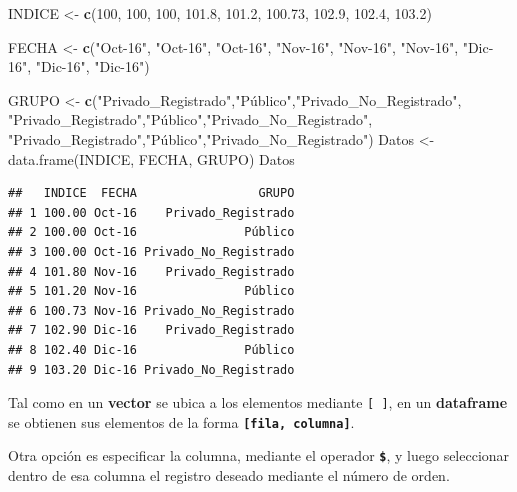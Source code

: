 \documentclass[]{book}
\newenvironment{Shaded}{\begin{snugshade}}{\end{snugshade}}
\newcommand{\DecValTok}[1]{\textcolor[rgb]{0.00,0.00,0.81}{#1}}
\newcommand{\FloatTok}[1]{\textcolor[rgb]{0.00,0.00,0.81}{#1}}
\newcommand{\KeywordTok}[1]{\textcolor[rgb]{0.13,0.29,0.53}{\textbf{#1}}}
\newcommand{\NormalTok}[1]{#1}
\newcommand{\StringTok}[1]{\textcolor[rgb]{0.31,0.60,0.02}{#1}}
\begin{document}
\begin{Shaded}
\begin{Highlighting}[]
\NormalTok{INDICE  <-}\StringTok{ }\KeywordTok{c}\NormalTok{(}\DecValTok{100}\NormalTok{,   }\DecValTok{100}\NormalTok{,   }\DecValTok{100}\NormalTok{,}
             \FloatTok{101.8}\NormalTok{, }\FloatTok{101.2}\NormalTok{, }\FloatTok{100.73}\NormalTok{,}
             \FloatTok{102.9}\NormalTok{, }\FloatTok{102.4}\NormalTok{, }\FloatTok{103.2}\NormalTok{)}

\NormalTok{FECHA  <-}\StringTok{  }\KeywordTok{c}\NormalTok{(}\StringTok{"Oct-16"}\NormalTok{, }\StringTok{"Oct-16"}\NormalTok{, }\StringTok{"Oct-16"}\NormalTok{,}
             \StringTok{"Nov-16"}\NormalTok{, }\StringTok{"Nov-16"}\NormalTok{, }\StringTok{"Nov-16"}\NormalTok{,}
             \StringTok{"Dic-16"}\NormalTok{, }\StringTok{"Dic-16"}\NormalTok{, }\StringTok{"Dic-16"}\NormalTok{)}

\NormalTok{GRUPO  <-}\StringTok{  }\KeywordTok{c}\NormalTok{(}\StringTok{"Privado_Registrado"}\NormalTok{,}\StringTok{"Público","}\NormalTok{Privado_No_Registrado}\StringTok{",}
\StringTok{             "}\NormalTok{Privado_Registrado}\StringTok{","}\NormalTok{Público",}\StringTok{"Privado_No_Registrado"}\NormalTok{,}
             \StringTok{"Privado_Registrado"}\NormalTok{,}\StringTok{"Público","}\NormalTok{Privado_No_Registrado}\StringTok{")}
\StringTok{             }
\StringTok{Datos <- data.frame(INDICE, FECHA, GRUPO)}
\StringTok{Datos}
\end{Highlighting}
\end{Shaded}

\begin{verbatim}
##   INDICE  FECHA                 GRUPO
## 1 100.00 Oct-16    Privado_Registrado
## 2 100.00 Oct-16               Público
## 3 100.00 Oct-16 Privado_No_Registrado
## 4 101.80 Nov-16    Privado_Registrado
## 5 101.20 Nov-16               Público
## 6 100.73 Nov-16 Privado_No_Registrado
## 7 102.90 Dic-16    Privado_Registrado
## 8 102.40 Dic-16               Público
## 9 103.20 Dic-16 Privado_No_Registrado
\end{verbatim}

Tal como en un \textbf{vector} se ubica a los elementos mediante \texttt{{[}\ {]}}, en un \textbf{dataframe} se obtienen sus elementos de la forma \textbf{\texttt{{[}fila,\ columna{]}}}.

Otra opción es especificar la columna, mediante el operador \textbf{\texttt{\$}}, y luego seleccionar dentro de esa columna el registro deseado mediante el número de orden.
\end{document}
